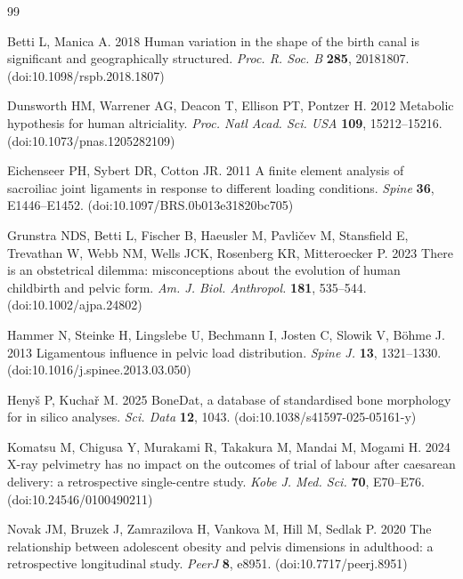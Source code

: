 \documentclass[11pt,a4paper]{article}
\begin{document}
\begin{thebibliography}{99}

Betti L, Manica A. 2018 Human variation in the shape of the birth canal is significant and geographically structured. \emph{Proc. R. Soc. B} \textbf{285}, 20181807. (doi:10.1098/rspb.2018.1807)

Dunsworth HM, Warrener AG, Deacon T, Ellison PT, Pontzer H. 2012 Metabolic hypothesis for human altriciality. \emph{Proc. Natl Acad. Sci. USA} \textbf{109}, 15212--15216. (doi:10.1073/pnas.1205282109)

Eichenseer PH, Sybert DR, Cotton JR. 2011 A finite element analysis of sacroiliac joint ligaments in response to different loading conditions. \emph{Spine} \textbf{36}, E1446--E1452. (doi:10.1097/BRS.0b013e31820bc705)

Grunstra NDS, Betti L, Fischer B, Haeusler M, Pavli\v{c}ev M, Stansfield E, Trevathan W, Webb NM, Wells JCK, Rosenberg KR, Mitteroecker P. 2023 There is an obstetrical dilemma: misconceptions about the evolution of human childbirth and pelvic form. \emph{Am. J. Biol. Anthropol.} \textbf{181}, 535--544. (doi:10.1002/ajpa.24802)

Hammer N, Steinke H, Lingslebe U, Bechmann I, Josten C, Slowik V, B\"ohme J. 2013 Ligamentous influence in pelvic load distribution. \emph{Spine J.} \textbf{13}, 1321--1330. (doi:10.1016/j.spinee.2013.03.050)

Heny\v{s} P, Kucha\v{r} M. 2025 BoneDat, a database of standardised bone morphology for in silico analyses. \emph{Sci. Data} \textbf{12}, 1043. (doi:10.1038/s41597-025-05161-y)

Komatsu M, Chigusa Y, Murakami R, Takakura M, Mandai M, Mogami H. 2024 X-ray pelvimetry has no impact on the outcomes of trial of labour after caesarean delivery: a retrospective single-centre study. \emph{Kobe J. Med. Sci.} \textbf{70}, E70--E76. (doi:10.24546/0100490211)

Novak JM, Bruzek J, Zamrazilova H, Vankova M, Hill M, Sedlak P. 2020 The relationship between adolescent obesity and pelvis dimensions in adulthood: a retrospective longitudinal study. \emph{PeerJ} \textbf{8}, e8951. (doi:10.7717/peerj.8951)


\end{thebibliography}
\end{document}
